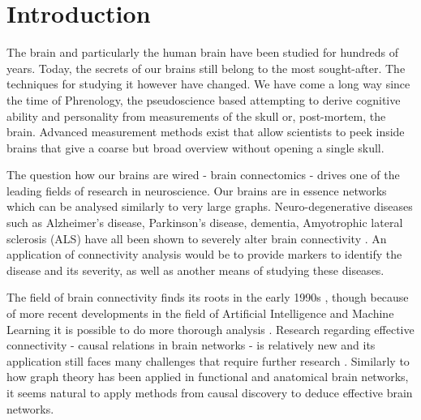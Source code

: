 \documentclass[a4paper, 10pt, english, onecolumn]{article}
\title{\fontfamily{phv}\selectfont{Causal Discovery methods for Effective Connectivity in Human Brains}}
\author{
  \textbf{R. Janssen} - \href{mailto:ramon.janssen@student.ru.nl}{ramon.janssen@student.ru.nl} \\
  \textbf{T. de Ruijter} - \href{mailto:t.deruijter@student.ru.nl}{t.deruijter@student.ru.nl}\\
}
\date{\fontfamily{ptm}\selectfont{\small{\bfseries{\today - Radboud
Universiteit Nijmegen}}}\\[0.5cm]\rule{\linewidth}{0.3mm}}
\begin{document}
\maketitle

\setlength{\parindent}{0.0cm}
\setlength{\parskip}{3mm plus2mm minus1.5mm}

\begin{abstract}
\end{abstract}

\section{Introduction}
The brain and particularly the human brain have been studied for hundreds of years.
Today, the secrets of our brains still belong to the most sought-after.
The techniques for studying it however have changed.
We have come a long way since the time of Phrenology, the pseudoscience based attempting to derive cognitive ability and personality from measurements of the skull or, post-mortem, the brain.
Advanced measurement methods exist that allow scientists to peek inside brains that give a coarse but broad overview without opening a single skull.

The question how our brains are wired - brain connectomics - drives one of the leading fields of research in neuroscience.
Our brains are in essence networks which can be analysed similarly to very large graphs.
Neuro-degenerative diseases such as Alzheimer's disease, Parkinson's disease, dementia, Amyotrophic lateral sclerosis (ALS) have all been shown to severely alter brain connectivity \cite{Bullmore2009}.
An application of connectivity analysis would be to provide markers to identify the disease and its severity, as well as another means of studying these diseases.

The field of brain connectivity finds its roots in the early 1990s \cite{friston1993functional, friston1994}, though because of more recent developments in the field of Artificial Intelligence and Machine Learning it is possible to do more thorough analysis \cite{vandenheuvel2010}.
Research regarding effective connectivity - causal relations in brain networks - is relatively new and its application still faces many challenges that require further research \cite{ramsey2010}.
Similarly to how graph theory has been applied in functional and anatomical brain networks, it seems natural to apply methods from causal discovery to deduce effective brain networks.
\end{document}
